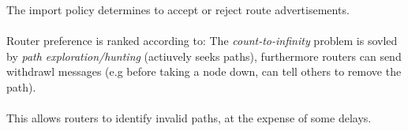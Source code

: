 \documentclass{report}
\begin{document}
{{            }
            The  import policy determines to accept or reject route advertisements.
            \\
            \\ Router preference is ranked according to:
            The \textit{count-to-infinity} problem is sovled by \textit{path exploration/hunting} (actiuvely seeks paths), furthermore routers can send withdrawl messages (e.g before taking a node down, can tell others to remove the path).
            \\
            \\ This allows routers to identify invalid paths, at the expense of some delays.
        }
\end{document}
